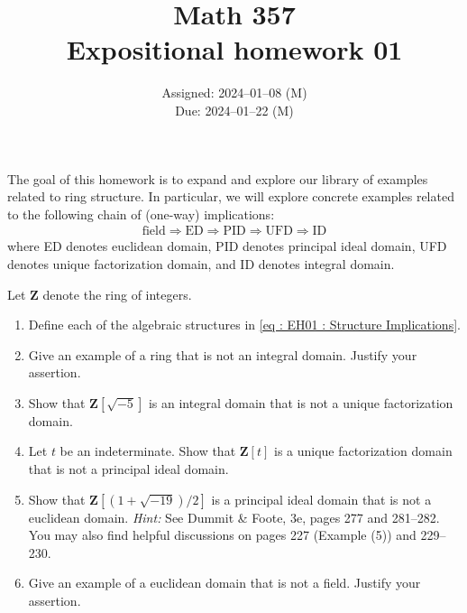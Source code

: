 \documentclass[oneside, english, 11pt]{article}
\title{Math 357\\Expositional homework 01}
\author{}
\date{Assigned: 2024--01--08 (M)\\Due: 2024--01--22 (M)}
\newcommand{\fontHint}[1]{\emph{Hint:} #1}
\newcommand{\integers}{\mathbf{Z}}
\newcommand{\Z}{\integers}
\begin{document}
\maketitle

The goal of this homework is to expand and explore our library of examples related to ring structure. In particular, we will explore concrete examples related to the following chain of (one-way) implications:
\begin{align}
\text{field} \Rightarrow \text{ED} \Rightarrow \text{PID} \Rightarrow \text{UFD} \Rightarrow \text{ID}%
\label{eq : EH01 : Structure Implications}
\end{align}
where ED denotes euclidean domain, PID denotes principal ideal domain, UFD denotes unique factorization domain, and ID denotes integral domain.

Let $\Z$ denote the ring of integers.
\begin{enumerate}[label=(\alph*)]
\item Define each of the algebraic structures in \eqref{eq : EH01 : Structure Implications}.
\item Give an example of a ring that is not an integral domain. Justify your assertion.
\item Show that $\Z[\sqrt{-5}]$ is an integral domain that is not a unique factorization domain.
\item Let $t$ be an indeterminate. Show that $\Z[t]$ is a unique factorization domain that is not a principal ideal domain.
\item Show that $\Z[(1 + \sqrt{-19}) / 2]$ is a principal ideal domain that is not a euclidean domain. \fontHint{See Dummit \&{} Foote, 3e, pages 277 and 281--282. You may also find helpful discussions on pages 227 (Example (5)) and 229--230.}
\item Give an example of a euclidean domain that is not a field. Justify your assertion.
\end{enumerate}
\end{document}
